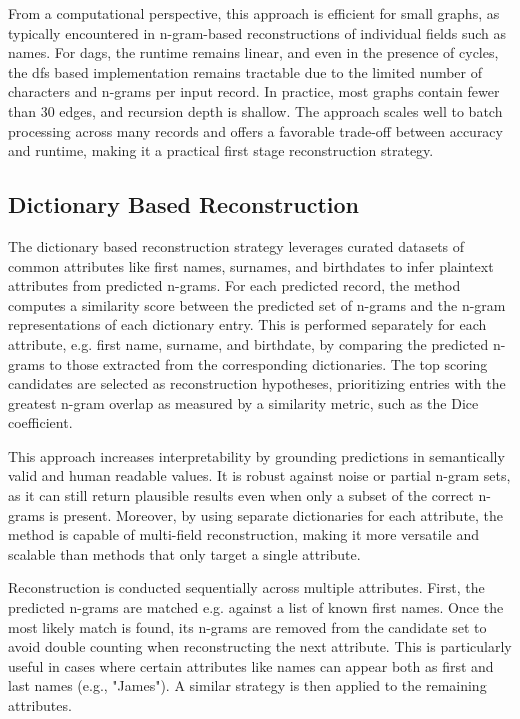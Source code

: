 From a computational perspective, this approach is efficient for small graphs, as typically encountered in n-gram-based reconstructions of individual fields such as names.
For \ac{dag}s, the runtime remains linear, and even in the presence of cycles, the \ac{dfs} based implementation remains tractable due to the limited number of characters and n-grams per input record.
In practice, most graphs contain fewer than 30 edges, and recursion depth is shallow.
The approach scales well to batch processing across many records and offers a favorable trade-off between accuracy and runtime, making it a practical first stage reconstruction strategy.

\subsection{Dictionary Based Reconstruction} \label{sec:dictrecon}

The dictionary based reconstruction strategy leverages curated datasets of common attributes like first names, surnames, and birthdates to infer plaintext attributes from predicted n-grams.
For each predicted record, the method computes a similarity score between the predicted set of n-grams and the n-gram representations of each dictionary entry.
This is performed separately for each attribute, e.g. first name, surname, and birthdate, by comparing the predicted n-grams to those extracted from the corresponding dictionaries.
The top scoring candidates are selected as reconstruction hypotheses, prioritizing entries with the greatest n-gram overlap as measured by a similarity metric, such as the Dice coefficient.

This approach increases interpretability by grounding predictions in semantically valid and human readable values.
It is robust against noise or partial n-gram sets, as it can still return plausible results even when only a subset of the correct n-grams is present.
Moreover, by using separate dictionaries for each attribute, the method is capable of multi-field reconstruction, making it more versatile and scalable than methods that only target a single attribute.

Reconstruction is conducted sequentially across multiple attributes.
First, the predicted n-grams are matched e.g. against a list of known first names.
Once the most likely match is found, its n-grams are removed from the candidate set to avoid double counting when reconstructing the next attribute.
This is particularly useful in cases where certain attributes like names can appear both as first and last names (e.g., "James").
A similar strategy is then applied to the remaining attributes.

